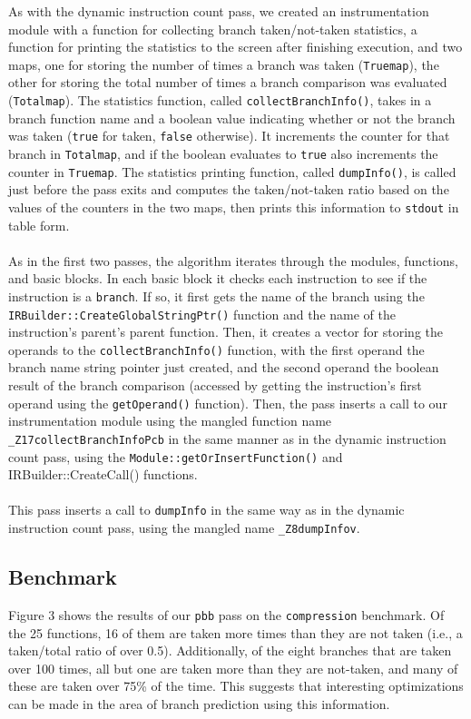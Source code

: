 \documentclass[12pt]{article}
\begin{document}
As with the dynamic instruction count pass, we created an instrumentation module with a function for collecting branch taken/not-taken statistics, a function for printing the statistics to the screen after finishing execution, and two maps, one for storing the number of times a branch was taken ({\tt Truemap}), the other for storing the total number of times a branch comparison was evaluated ({\tt Totalmap}). The statistics function, called {\tt collectBranchInfo()}, takes in a branch function name and a boolean value indicating whether or not the branch was taken ({\tt true} for taken, {\tt false} otherwise). It increments the counter for that branch in {\tt Totalmap}, and if the boolean evaluates to {\tt true} also increments the counter in {\tt Truemap}. The statistics printing function, called {\tt dumpInfo()}, is called just before the pass exits and computes the taken/not-taken ratio based on the values of the counters in the two maps, then prints this information to {\tt stdout} in table form.
\\\\
As in the first two passes, the algorithm iterates through the modules, functions, and basic blocks. In each basic block it checks each instruction to see if the instruction is a {\tt branch}. If so, it first gets the name of the branch using the {\tt IRBuilder::CreateGlobalStringPtr()} function and the name of the instruction's parent's parent function. Then, it creates a vector for storing the operands to the {\tt collectBranchInfo()} function, with the first operand the branch name string pointer just created, and the second operand the boolean result of the branch comparison (accessed by getting the instruction's first operand using the {\tt getOperand()} function). Then, the pass inserts a call to our instrumentation module using the mangled function name {\tt \_Z17collectBranchInfoPcb} in the same manner as in the dynamic instruction count pass, using the {\tt Module::getOrInsertFunction()} and {IRBuilder::CreateCall()} functions.
\\\\
This pass inserts a call to {\tt dumpInfo} in the same way as in the dynamic instruction count pass, using the mangled name {\tt \_Z8dumpInfov}.


\subsection{Benchmark}

Figure 3 shows the results of our {\tt pbb} pass on the {\tt compression} benchmark. Of the 25 functions, 16 of them are taken more times than they are not taken (i.e., a taken/total ratio of over 0.5). Additionally, of the eight branches that are taken over 100 times, all but one are taken more than they are not-taken, and many of these are taken over 75\% of the time. This suggests that interesting optimizations can be made in the area of branch prediction using this information.
\end{document}
